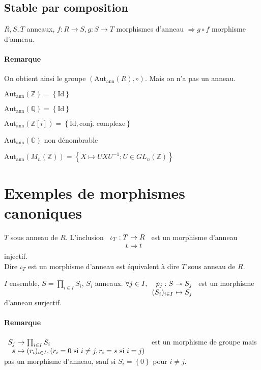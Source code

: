 \documentclass[reqno,a4paper,10pt]{report}
\makeatletter
\newcommand{\set}[1]{\left\lbrace #1 \right\rbrace} %
\newcommand{\IZ}{\ensuremath{\mathbb{Z}}\xspace} %
\newcommand{\IQ}{\ensuremath{\mathbb{Q}}\xspace} %
\newcommand{\IC}{\ensuremath{\mathbb{C}}\xspace} %
\newcommand{\so}{\Rightarrow}
\newcommand{\surj}{\twoheadrightarrow}
\newcommand{\id}{\ensuremath{\mathrm{Id}}} %
\newcommand{\pfootnote}[1]{\up{(}\footnote{#1}\up{)}} %
\newcommand{\Autann}[1]{\text{Aut}_{\text{ann}}\left(#1\right)}
\let\olditemize=\itemize%
\renewenvironment{itemize}{%
    \olditemize%
  }{%
    \@noparlisttrue%
    \endlist%
  }%
\let\oldenumerate=\enumerate%
\renewenvironment{enumerate}{%
    \oldenumerate%
  }{%
    \@noparlisttrue%
    \endlist%
  }%
\makeatother
\begin{document}
\subsection{Stable par composition}
$R, S, T$ anneaux, $f:R \to S, g: S \to T$ morphismes d'anneau $\so g\circ f$
morphisme d'anneau.

\paragraph{Remarque} On obtient ainsi le groupe $(\Autann{R}, \circ)$. Mais on
n'a pas un anneau.
\begin{comment}
  \pfootnote{détails 01/10/09 p1}
\end{comment}
\begin{itemize}
  \item $\Autann{\IZ} = \set{\id}$
  \item $\Autann{\IQ} = \set{\id}$
  \item $\Autann{\IZ[i]} = \set{\id, \text{conj. complexe}}$
  \item $\Autann{\IC}$ non dénombrable
  \item $\Autann{M_n(\IZ)}=\set{X \mapsto UXU^{-1};U \in GL_n(\IZ)}$
\end{itemize}

\section{Exemples de morphismes canoniques}
\begin{enumerate}
  \item $T$ sous anneau de $R$. L'inclusion
    $\begin{array}[t]{r@{\ }l}
      \iota_T : T &\to R\\
      t &\mapsto t
    \end{array}$ est un morphisme d'anneau injectif.\\
    Dire $\iota_T$ est un morphisme d'anneau est équivalent à dire $T$ sous
    anneau de $R$.
  \item $I$ ensemble, $S=\prod_{i\in I}S_i$, $S_i$ anneaux.
    $\forall j \in I, \begin{array}[t]{r@{\ }l}
      p_j : S &\surj S_j \\
      (S_i)_{i\in I} &\mapsto S_j
    \end{array}$ est un morphisme d'anneau surjectif.
\end{enumerate}

\paragraph{Remarque}
$\begin{array}[t]{r@{\ }l}
  S_j &\to \prod_{i\in I} S_i\\
  s &\mapsto (r_i)_{i \in I}, (r_i = 0 \text{ si } i\neq j, r_i=s
  \text{ si } i=j)
\end{array}$ est un morphisme de groupe mais pas un morphisme d'anneau, sauf
si $S_i=\set{0}$ pour $i\neq j$.
\end{document}
